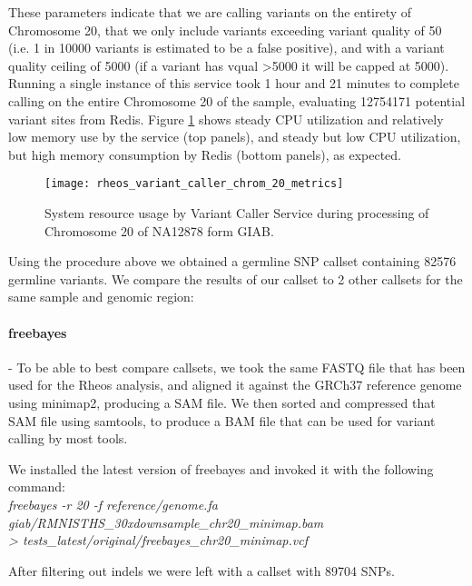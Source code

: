 These parameters indicate that we are calling variants on the entirety of Chromosome 20, that we only include variants exceeding variant quality of 50 (i.e. 1 in 10000 variants is estimated to be a false positive), and with a variant quality ceiling of 5000 (if a variant has vqual >5000 it will be capped at 5000). Running a single instance of this service took 1 hour and 21 minutes to complete calling on the entire Chromosome 20 of the sample, evaluating 12754171 potential variant sites from Redis. Figure \ref{fig:rheos_variant_caller_chrom20_metrics} shows steady CPU utilization and relatively low memory use by the service (top panels), and steady but low CPU utilization, but high memory consumption by Redis (bottom panels), as expected.

\begin{figure}[h!]
    \texttt{[image: rheos\_variant\_caller\_chrom\_20\_metrics]}
    \centering
    \caption {System resource usage by Variant Caller Service during processing of Chromosome 20 of NA12878 form GIAB.}
    \label{fig:rheos_variant_caller_chrom20_metrics}
\end{figure}

Using the procedure above we obtained a germline SNP callset containing 82576 germline variants. We compare the results of our callset to 2 other callsets for the same sample and genomic region:

\paragraph{freebayes} - To be able to best compare callsets, we took the same FASTQ file that has been used for the Rheos analysis, and aligned it against the GRCh37 reference genome using minimap2, producing a SAM file. We then sorted and compressed that SAM file using samtools, to produce a BAM file that can be used for variant calling by most tools.

We installed the latest version of freebayes\autocite{garrison2012haplotype} and invoked it with the following command:
\\
\emph{freebayes -r 20 -f reference/genome.fa \\
giab/RMNISTHS\_30xdownsample\_chr20\_minimap.bam\\
 > tests\_latest/original/freebayes\_chr20\_minimap.vcf}

After filtering out indels we were left with a callset with 89704 SNPs.


